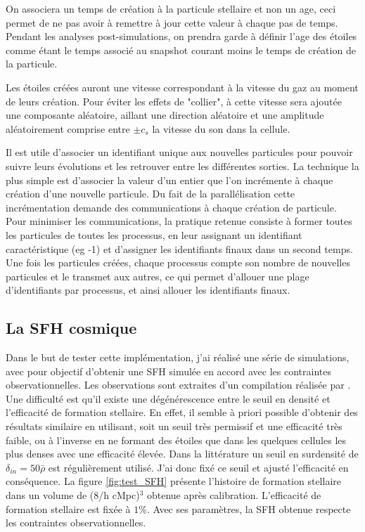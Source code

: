 On associera un temps de création à la particule stellaire et non un age, ceci permet de ne pas avoir à remettre à jour cette valeur à chaque pas de temps.
Pendant les analyses post-simulations, on prendra garde à définir l'age des étoiles comme étant le temps associé au snapshot courant moins le temps de création de la particule.

Les étoiles créées auront une vitesse correspondant à la vitesse du gaz au moment de leurs création.
Pour éviter les effets de "collier", à cette vitesse sera ajoutée une composante aléatoire, aillant une direction aléatoire et une amplitude aléatoirement comprise entre $\pm c_s$ la vitesse du son dans la cellule.

Il est utile d'associer un identifiant unique aux nouvelles particules pour pouvoir suivre leurs évolutions et les retrouver entre les différentes sorties.
La technique la plus simple est d'associer la valeur d'un entier que l'on incrémente à chaque création d'une nouvelle particule.
Du fait de la parallélisation cette incrémentation demande des communications à chaque création de particule.
Pour minimiser les communications, la pratique retenue consiste à former toutes les particules de toutes les processus, en leur assignant un identifiant caractéristique (eg -1) et d'assigner les identifiants finaux dans un second temps.
Une fois les particules créées, chaque processus compte son nombre de nouvelles particules et le transmet aux autres, ce qui permet d'allouer une plage d'identifiants par processus, et ainsi allouer les identifiants finaux.

\subsection{La SFH cosmique}

Dans le but de tester cette implémentation, j'ai réalisé une série de simulations, avec pour objectif d'obtenir une \ac{SFH} simulée en accord avec les contraintes observationnelles.
Les observations sont extraites d'un compilation réalisée par \cite{madau_cosmic_2014}.
Une difficulté est qu'il existe une dégénérescence entre le seuil en densité et l'efficacité de formation stellaire.
En effet, il semble à priori possible d'obtenir des résultats similaire en utilisant, soit un seuil très permissif et une efficacité très faible, ou à l'inverse en ne formant des étoiles que dans les quelques cellules les plus denses avec une efficacité élevée.
Dans la littérature %
un seuil en surdensité de $\delta_{in}=50\bar{\rho}$ est régulièrement utilisé.
J'ai donc fixé ce seuil et ajusté l'efficacité en conséquence.
La figure \ref{fig:test_SFH} présente l'histoire de formation stellaire dans un volume de (8/h cMpc)$^3$ obtenue après calibration. 
L'efficacité de formation stellaire est fixée à $1\%$.
Avec ses paramètres, la \ac{SFH} obtenue respecte les contraintes observationnelles.

